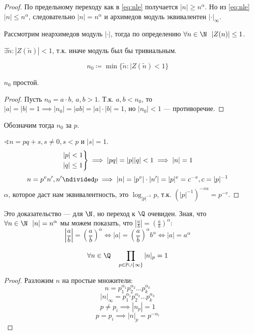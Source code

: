 \begin{proof}
	По предельному переходу как в \eqref{eq:nle} получается \(|n| \ge n^\alpha\).
	Но из \eqref{eq:nle} \(|n| \le n^\alpha\), следовательно \(|n| = n^\alpha\)
	и архимедов модуль эквивалентен \(|\cdot|_{\infty}\).

	Рассмотрим неархимедов модуль \(|\cdot|\), тогда по определению \(\forall n \in \N \ \ |Z(n)| \le 1\).

	\(\exists \tilde{n} : |Z(\tilde{n})| < 1\), т.к. иначе модуль был бы тривиальным.

	\[n_0 \coloneqq \min \{\tilde{n} : |Z(\tilde{n}) < 1\}\]
	\begin{statement}
		\(n_0\) простой.
	\end{statement}
	\begin{proof}
		Пусть \(n_0 = a \cdot b, \ a, b > 1\).
		Т.к. \(a, b < n_0\), то \(|a| = |b| = 1 \implies |n_0| = |ab| = |a| \cdot |b| = 1\),
		но \(|n_0| < 1\) --- противоречие.
	\end{proof}

	Обозначим тогда \(n_0\) за \(p\).

	\(\sphericalangle n = pq + s, s \neq 0, s < p\) и \(|s| = 1\).
	\[\begin{rcases}
			|p| < 1 \\
			|q| \le 1
		\end{rcases} \implies |pq| = |p| |q| < 1 \implies |n| = 1\]
	\[n = p^v n', n' \ndivided p \implies |n| = |p^v| \cdot |n'| = |p|^v = c^{-v}, c = |p|^{-1}\]
	\(\alpha\), которое даст нам эквивалентность, это \(\log_{|p|^{-1}} p\),
	т.к. \((|p|^{-1})^{-v\alpha} = p^{-v}\).
\end{proof}

\begin{remark}
	Это доказательство --- для \(\N\), но переход к \(\Q\) очевиден. Зная, что \(\forall n \in \N \ \ |n| = n^\alpha\) мы можем показать, что \(\left|\frac{a}{b}\right| = \left(\frac{a}{b}\right)^\alpha\):
	\[\left|\frac{a}{b}\right| = \left(\frac{a}{b}\right)^\alpha \iff |a|
		= \left(\frac{a}{b}\right)^\alpha b^\alpha \iff |a| = a^\alpha\]
\end{remark}

\begin{statement}
	\[\forall n \in \Q \quad \prod_{p \in \mathbb{P} \cup \{\infty\}} |n|_p = 1\]
\end{statement}
\begin{proof}
	Разложим \(n\) на простые множители:
	\[n = p_1^{\alpha_1} p_2^{\alpha_2} \ldots p_k^{\alpha_k}\]
	\[|n|_{\infty} = p_1^{\alpha_1} p_2^{\alpha_2} \ldots p_k^{\alpha_k}\]
	\[p \neq p_i \implies |n_p| = 1\]
	\[p = p_i \implies |n|_p = p^{-\alpha_i}\]
\end{proof}

